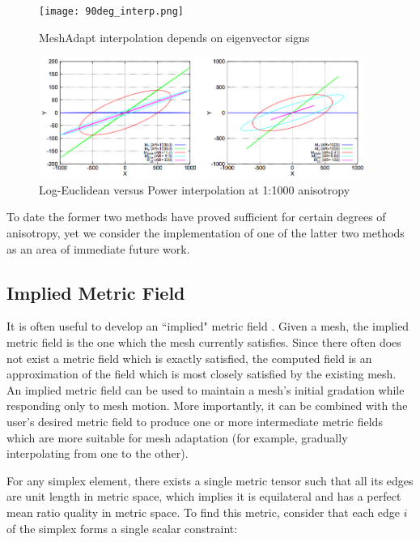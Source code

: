 \begin{figure}
\begin{center}
\texttt{[image: 90deg\_interp.png]}
\caption{MeshAdapt interpolation depends on eigenvector signs}
\label{fig:90deg_interp}
\end{center}
\end{figure}

\begin{figure}
\begin{center}
\includegraphics[width=0.95\textwidth]{log_interp.png}
\caption{Log-Euclidean versus Power interpolation
at 1:1000 anisotropy \cite{michal2012anisotropic}}
\label{fig:log_interp}
\end{center}
\end{figure}

To date the former two methods have proved sufficient for certain
degrees of anisotropy, yet we consider the implementation of one
of the latter two methods as an area of immediate future work.

\subsection{Implied Metric Field}
\label{sec:ident_metric}

It is often useful to develop an ``implied" metric field
\cite{michal2012anisotropic}.
Given a mesh, the implied metric field is the one which the mesh
currently satisfies.
Since there often does not exist a metric field which is exactly
satisfied, the computed field is an approximation of the field
which is most closely satisfied by the existing mesh.
An implied metric field can be used to maintain a mesh's
initial gradation while responding only to mesh motion.
More importantly, it can be combined with the user's desired
metric field to produce one or more intermediate metric fields
which are more suitable for mesh adaptation
(for example, gradually interpolating from one to the other).

For any simplex element, there exists a single metric tensor
such that all its edges are unit length in metric space, which
implies it is equilateral and has a perfect mean ratio quality
in metric space.
To find this metric, consider that each edge $i$ of the simplex
forms a single scalar constraint:

